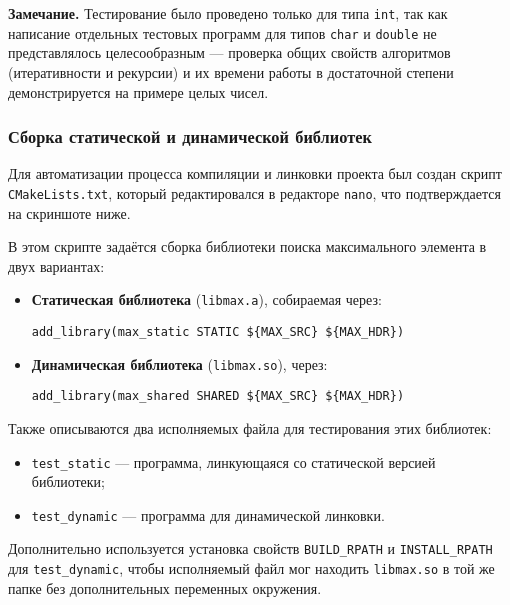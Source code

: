 \vspace{0.3cm}
\noindent\textbf{Замечание.} Тестирование было проведено только для типа \texttt{int}, так как написание отдельных тестовых программ для типов \texttt{char} и \texttt{double} не представлялось целесообразным — проверка общих свойств алгоритмов (итеративности и рекурсии) и их времени работы в достаточной степени демонстрируется на примере целых чисел.

\subsubsection{Сборка статической и динамической библиотек}

Для автоматизации процесса компиляции и линковки проекта был создан скрипт \texttt{CMakeLists.txt}, который редактировался в редакторе \texttt{nano}, что подтверждается на скриншоте ниже.


\vspace{0.5em}
В этом скрипте задаётся сборка библиотеки поиска максимального элемента в двух вариантах:
\begin{itemize}
\item \textbf{Статическая библиотека} (\texttt{libmax.a}), собираемая через:
\begin{lstlisting}
add_library(max_static STATIC ${MAX_SRC} ${MAX_HDR})
\end{lstlisting}
\item \textbf{Динамическая библиотека} (\texttt{libmax.so}), через:
\begin{lstlisting}
add_library(max_shared SHARED ${MAX_SRC} ${MAX_HDR})
\end{lstlisting}
\end{itemize}

Также описываются два исполняемых файла для тестирования этих библиотек:
\begin{itemize}
\item \texttt{test\_static} — программа, линкующаяся со статической версией библиотеки;
\item \texttt{test\_dynamic} — программа для динамической линковки.
\end{itemize}

Дополнительно используется установка свойств \texttt{BUILD\_RPATH} и \texttt{INSTALL\_RPATH} для \texttt{test\_dynamic}, чтобы исполняемый файл мог находить \texttt{libmax.so} в той же папке без дополнительных переменных окружения.

